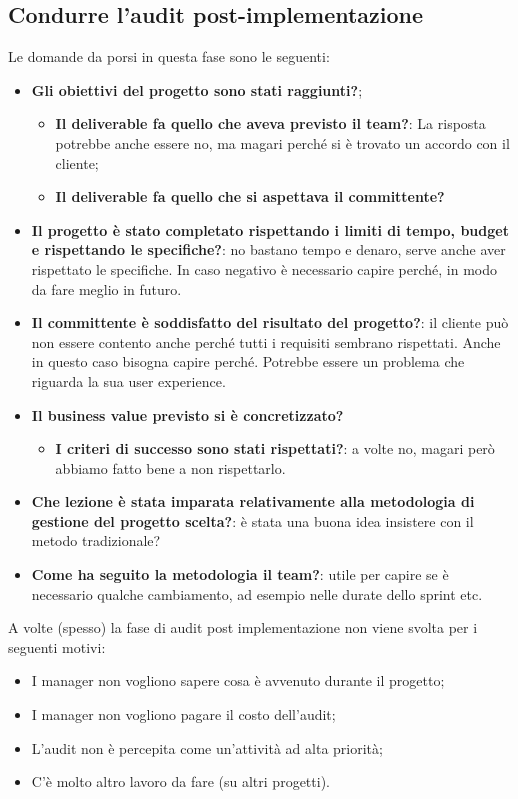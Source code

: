\subsection{Condurre l’audit post-implementazione}
Le domande da porsi in questa fase sono le seguenti:
\begin{itemize}
	\item \textbf{Gli obiettivi del progetto sono stati raggiunti?};
	\begin{itemize}
		\item \textbf{Il deliverable fa quello che aveva previsto il team?}: La risposta potrebbe anche essere no, ma magari perché si è trovato un accordo con il cliente;
		\item \textbf{Il deliverable fa quello che si aspettava il committente?}
	\end{itemize}
	\item \textbf{Il progetto è stato completato rispettando i limiti di tempo, budget e rispettando le specifiche?}: no bastano tempo e denaro, serve anche aver rispettato le specifiche. In caso negativo è necessario capire perché, in modo da fare meglio in futuro.
	\item \textbf{Il committente è soddisfatto del risultato del progetto?}: il cliente può non essere contento anche perché tutti i requisiti sembrano rispettati. Anche in questo caso bisogna capire perché. Potrebbe essere un problema che riguarda la sua user experience.
	\item \textbf{Il business value previsto si è concretizzato?}
	\begin{itemize}
		\item \textbf{I criteri di successo sono stati rispettati?}: a volte no, magari però abbiamo fatto bene a non rispettarlo.
	\end{itemize}
	\item \textbf{Che lezione è stata imparata relativamente alla metodologia di gestione del progetto scelta?}: è stata una buona idea insistere con il metodo tradizionale?
	\item \textbf{Come ha seguito la metodologia il team?}: utile per capire se è necessario qualche cambiamento, ad esempio nelle durate dello sprint etc.
\end{itemize}
A volte (spesso) la fase di audit post implementazione non viene svolta per i seguenti motivi:
\begin{itemize}
	\item I manager non vogliono sapere cosa è avvenuto durante il progetto;
	\item I manager non vogliono pagare il costo dell’audit;
	\item L’audit non è percepita come un’attività ad alta priorità;
	\item C’è molto altro lavoro da fare (su altri progetti).
\end{itemize}
